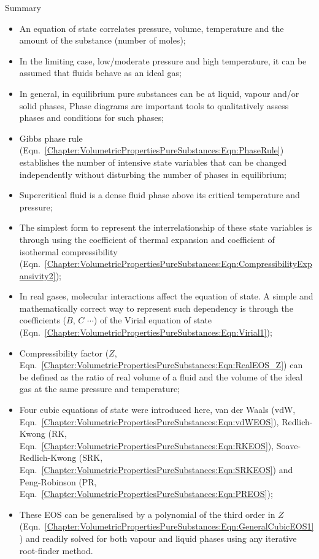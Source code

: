 \clearpage   
\begin{FinalSummaryBlock}{Summary}
    \begin{itemize}
       \item An equation of state correlates pressure, volume, temperature and the amount of the substance (\eg number of moles);
       \item In the limiting case, \ie low/moderate pressure and high temperature, it can be assumed that fluids behave as an ideal gas;
       \item In general, in equilibrium pure substances can be at liquid, vapour and/or solid phases, Phase diagrams are important tools to qualitatively assess phases and conditions for such phases;
       \item Gibbs phase rule (Eqn.~\ref{Chapter:VolumetricPropertiesPureSubstances:Eqn:PhaseRule}) establishes the number of intensive state variables that can be changed independently without disturbing the number of phases in equilibrium;
       \item Supercritical fluid is a dense fluid phase above its critical temperature and pressure;
       \item The simplest form to represent the interrelationship of these state variables is through using the coefficient of thermal expansion and coefficient of isothermal compressibility (Eqn.~\ref{Chapter:VolumetricPropertiesPureSubstances:Eqn:CompressibilityExpansivity2});
       \item In real gases, molecular interactions affect the equation of state. A simple and mathematically correct way to represent such dependency is through the coefficients ($B$, $C$ $\cdots$) of the Virial equation of state (Eqn.~\ref{Chapter:VolumetricPropertiesPureSubstances:Eqn:Virial1});
       \item Compressibility factor ($Z$, Eqn.~\ref{Chapter:VolumetricPropertiesPureSubstances:Eqn:RealEOS_Z}) can be defined as the ratio of real volume of a fluid and the volume of the ideal gas at the same pressure and temperature;
       \item Four cubic equations of state were introduced here, van der Waals (vdW, Eqn.~\ref{Chapter:VolumetricPropertiesPureSubstances:Eqn:vdWEOS}), Redlich-Kwong (RK, Eqn.~\ref{Chapter:VolumetricPropertiesPureSubstances:Eqn:RKEOS}), Soave-Redlich-Kwong (SRK, Eqn.~\ref{Chapter:VolumetricPropertiesPureSubstances:Eqn:SRKEOS}) and Peng-Robinson (PR, Eqn.~\ref{Chapter:VolumetricPropertiesPureSubstances:Eqn:PREOS});
       \item These EOS can be generalised by a polynomial of the third order in $Z$ (Eqn.~\ref{Chapter:VolumetricPropertiesPureSubstances:Eqn:GeneralCubicEOS1}) and readily solved for both vapour and liquid phases using any iterative root-finder method.
    \end{itemize}
\end{FinalSummaryBlock}

